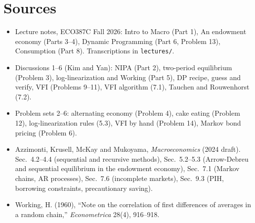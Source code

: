 \documentclass[12pt]{article}
\begin{document}
\section*{Sources}
\begin{itemize}
\item Lecture notes, ECO387C Fall 2026: Intro to Macro (Part 1), An endowment economy (Parts 3--4), Dynamic Programming (Part 6, Problem 13), Consumption (Part 8). Transcriptions in \texttt{lectures/}.
\item Discussions 1--6 (Kim and Yan): NIPA (Part 2), two-period equilibrium (Problem 3), log-linearization and Working (Part 5), DP recipe, guess and verify, VFI (Problems 9--11), VFI algorithm (7.1), Tauchen and Rouwenhorst (7.2).
\item Problem sets 2--6: alternating economy (Problem 4), cake eating (Problem 12), log-linearization rules (5.3), VFI by hand (Problem 14), Markov bond pricing (Problem 6).
\item Azzimonti, Krusell, McKay and Mukoyama, \emph{Macroeconomics} (2024 draft). Sec.~4.2--4.4 (sequential and recursive methods), Sec.~5.2--5.3 (Arrow-Debreu and sequential equilibrium in the endowment economy), Sec.~7.1 (Markov chains, AR processes), Sec.~7.6 (incomplete markets), Sec.~9.3 (PIH, borrowing constraints, precautionary saving).
\item Working, H. (1960), ``Note on the correlation of first differences of averages in a random chain,'' \emph{Econometrica} 28(4), 916--918.
\end{itemize}
\end{document}
